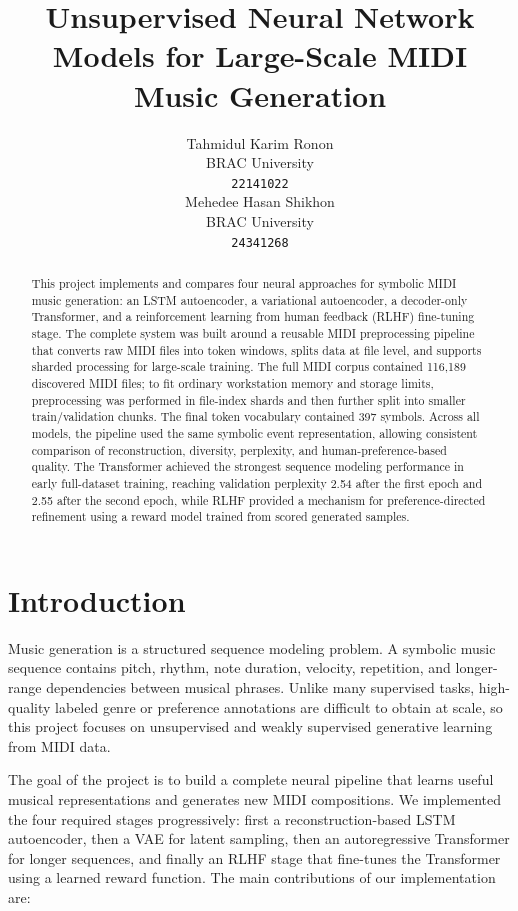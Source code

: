 \documentclass{article}
\title{Unsupervised Neural Network Models for Large-Scale MIDI Music Generation}
\author{
  Tahmidul Karim Ronon \\
  BRAC University \\
  \texttt{22141022} \\
  \And
  Mehedee Hasan Shikhon \\
  BRAC University \\
  \texttt{24341268}
}
\begin{document}
\maketitle

\begin{abstract}
This project implements and compares four neural approaches for symbolic MIDI music generation: an LSTM autoencoder, a variational autoencoder, a decoder-only Transformer, and a reinforcement learning from human feedback (RLHF) fine-tuning stage. The complete system was built around a reusable MIDI preprocessing pipeline that converts raw MIDI files into token windows, splits data at file level, and supports sharded processing for large-scale training. The full MIDI corpus contained 116,189 discovered MIDI files; to fit ordinary workstation memory and storage limits, preprocessing was performed in file-index shards and then further split into smaller train/validation chunks. The final token vocabulary contained 397 symbols. Across all models, the pipeline used the same symbolic event representation, allowing consistent comparison of reconstruction, diversity, perplexity, and human-preference-based quality. The Transformer achieved the strongest sequence modeling performance in early full-dataset training, reaching validation perplexity 2.54 after the first epoch and 2.55 after the second epoch, while RLHF provided a mechanism for preference-directed refinement using a reward model trained from scored generated samples.
\end{abstract}

\section{Introduction}
Music generation is a structured sequence modeling problem. A symbolic music sequence contains pitch, rhythm, note duration, velocity, repetition, and longer-range dependencies between musical phrases. Unlike many supervised tasks, high-quality labeled genre or preference annotations are difficult to obtain at scale, so this project focuses on unsupervised and weakly supervised generative learning from MIDI data.

The goal of the project is to build a complete neural pipeline that learns useful musical representations and generates new MIDI compositions. We implemented the four required stages progressively: first a reconstruction-based LSTM autoencoder, then a VAE for latent sampling, then an autoregressive Transformer for longer sequences, and finally an RLHF stage that fine-tunes the Transformer using a learned reward function. The main contributions of our implementation are:
\end{document}

